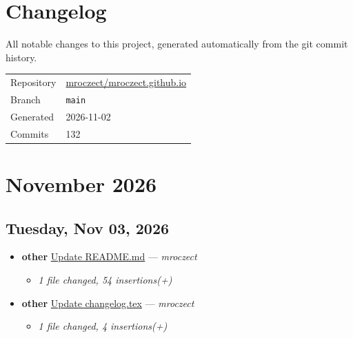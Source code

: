 \section*{Changelog}

All notable changes to this project, generated automatically from the git commit history.

\begin{table}[H]
  \centering
  \begin{tabularx}{\textwidth}{@{} l X @{}}
    \toprule
    Repository & \href{https://github.com/mroczect/mroczect.github.io}{mroczect/mroczect.github.io} \\
    Branch     & \texttt{main} \\
    Generated  & 2026-11-02 \\
    Commits    & 132 \\
    \bottomrule
  \end{tabularx}
\end{table}

\section*{November 2026}

\subsection*{Tuesday, Nov 03, 2026}

\begin{itemize}[leftmargin=1.5em]
  \item \textbf{other} \href{https://github.com/mroczect/mroczect.github.io/commit/ccc805b6e23483fb121ed47e0f55fd93241c6737}{Update README.md} --- \textit{mroczect}
  \begin{itemize}[leftmargin=1.5em]
    \item \small\textit{1 file changed, 54 insertions(+)}
  \end{itemize}
  \item \textbf{other} \href{https://github.com/mroczect/mroczect.github.io/commit/f710acb6b01ea203ff4e677d06ad37ee02448623}{Update changelog.tex} --- \textit{mroczect}
  \begin{itemize}[leftmargin=1.5em]
    \item \small\textit{1 file changed, 4 insertions(+)}
  \end{itemize}
\end{itemize}


